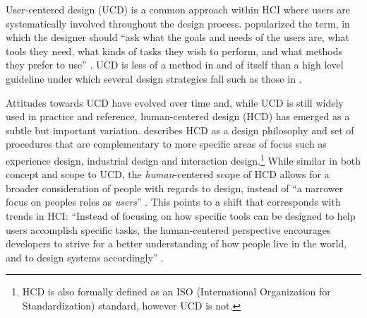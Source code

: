 \documentclass[Sullivan_phd_thesis.tex]{subfiles}
\begin{document}
User-centered design (UCD) is a common approach within HCI where users are systematically involved throughout the design process. \textcite{Norman1988} popularized the term, in which the designer should ``ask what the goals and needs of the users are, what tools they need, what kinds of tasks they wish to perform, and what methods they prefer to use'' \parencite[as cited in][p. 44]{El-shimy2014}. UCD is less of a method in and of itself than a high level guideline under which several design strategies fall such as those in \textcite{greenberg2011sketching}. 

Attitudes towards UCD have evolved over time and, while UCD is still widely used in practice and reference, human-centered design (HCD) has emerged as a subtle but important variation. \textcite{Norman2013} describes HCD as a design philosophy and set of procedures that are complementary to more specific areas of focus such as experience design, industrial design and interaction design.\footnote{HCD is also formally defined as an ISO (International Organization for Standardization) standard, however UCD is not.} 
While similar in both concept and scope to UCD, the \emph{human}-centered scope of HCD allows for a broader consideration of people with regards to design, instead of ``a narrower focus on peoples roles as \emph{users}'' \parencite[p. 45]{Steen2011}. This points to a shift that corresponds with trends in HCI: ``Instead of focusing on how specific tools can be designed to help users accomplish specific tasks, the human-centered perspective encourages developers to strive for a better understanding of how people live in the world, and to design systems accordingly'' \parencite[p. 45]{El-shimy2014}. 
\end{document}
